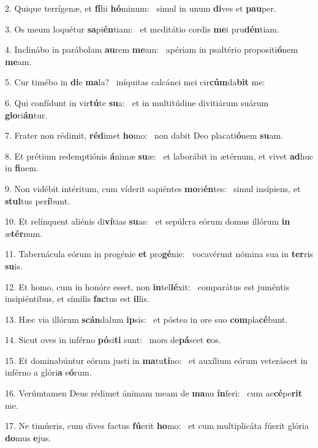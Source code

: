 2. Quique terrígenæ, et \textbf{fí}lii \textbf{hó}minum: \ast\  simul in unum \textbf{di}ves et \textbf{pau}per.\

3. Os meum loquétur \textbf{sa}pi\textbf{én}tiam: \ast\  et meditátio cordis \textbf{me}i pru\textbf{dén}tiam.\

4. Inclinábo in parábolam \textbf{au}rem \textbf{me}am: \ast\  apériam in psaltério propositi\textbf{ó}nem \textbf{me}am.\

5. Cur timébo in \textbf{di}e \textbf{ma}la? \ast\  iníquitas calcánei mei cir\textbf{cúm}da\textbf{bit} me:\

6. Qui confídunt in vir\textbf{tú}te \textbf{su}a: \ast\  et in multitúdine divitiárum suárum \textbf{glo}ri\textbf{án}tur.\

7. Frater non rédimit, \textbf{réd}imet \textbf{ho}mo: \ast\  non dabit Deo placati\textbf{ó}nem \textbf{su}am.\

8. Et prétium redemptiónis \textbf{á}nimæ \textbf{su}æ: \ast\  et laborábit in ætérnum, et vivet \textbf{ad}huc in \textbf{fi}nem.\

9. Non vidébit intéritum, cum víderit sapiéntes \textbf{mo}ri\textbf{én}tes: \ast\  simul insípiens, et \textbf{stul}tus per\textbf{í}bunt.\

10. Et relínquent aliénis di\textbf{ví}tias \textbf{su}as: \ast\  et sepúlcra eórum domus illórum \textbf{in} æ\textbf{tér}num.\

11. Tabernácula eórum in progénie \textbf{et} pro\textbf{gé}nie: \ast\  vocavérunt nómina sua in \textbf{ter}ris \textbf{su}is.\

12. Et homo, cum in honóre esset, non \textbf{in}tel\textbf{lé}xit: \ast\  comparátus est juméntis insipiéntibus, et símilis \textbf{fac}tus est \textbf{il}lis.\

13. Hæc via illórum \textbf{scán}dalum \textbf{ip}sis: \ast\  et póstea in ore suo \textbf{com}pla\textbf{cé}bunt.\

14. Sicut oves in inférno \textbf{pó}si\textbf{ti} sunt: \ast\  mors de\textbf{pá}scet \textbf{e}os.\

15. Et dominabúntur eórum justi in \textbf{ma}tu\textbf{tí}no: \ast\  et auxílium eórum veteráscet in inférno a glóri\textbf{a} e\textbf{ó}rum.\

16. Verúmtamen Deus rédimet ánimam meam de \textbf{ma}nu \textbf{ín}feri: \ast\  cum ac\textbf{cé}pe\textbf{rit} me.\

17. Ne timúeris, cum dives factus \textbf{fú}erit \textbf{ho}mo: \ast\  et cum multiplicáta fúerit glória \textbf{do}mus \textbf{e}jus.\

